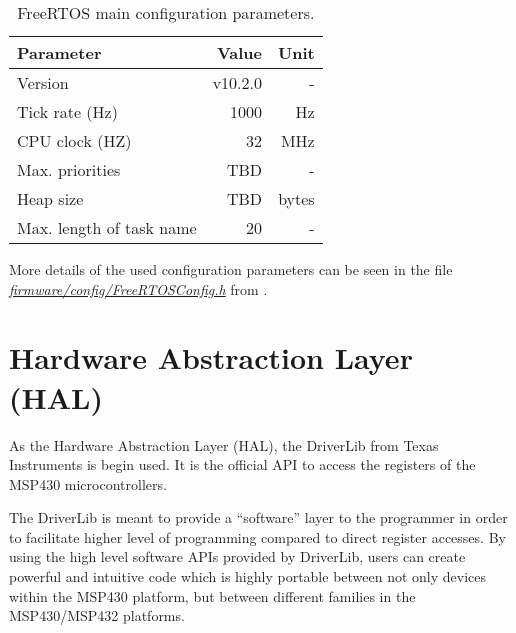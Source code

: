 \begin{table}[!h]
    \centering
    \begin{tabular}{lrr}
        \toprule[1.5pt]
        \textbf{Parameter}       & \textbf{Value} & \textbf{Unit} \\
        \midrule
        Version                  & v10.2.0        & - \\
        Tick rate (Hz)           & 1000           & Hz \\
        CPU clock (HZ)           & 32             & MHz \\
        Max. priorities          & TBD            & - \\
        Heap size                & TBD            & bytes \\
        Max. length of task name & 20             & - \\
        \bottomrule[1.5pt]
    \end{tabular}
    \caption{FreeRTOS main configuration parameters.}
    \label{tab:freertos-config}
\end{table}

More details of the used configuration parameters can be seen in the file \textit{\href{https://github.com/spacelab-ufsc/eps2/blob/master/firmware/config/FreeRTOSConfig.h}{firmware/config/FreeRTOSConfig.h}} from \cite{eps2}.

\section{Hardware Abstraction Layer (HAL)}

As the Hardware Abstraction Layer (HAL), the DriverLib \cite{driverlib} from Texas Instruments is begin used. It is the official API to access the registers of the MSP430 microcontrollers.

The DriverLib is meant to provide a ``software'' layer to the programmer in order to facilitate higher level of programming compared to direct register accesses. By using the high level software APIs provided by DriverLib, users can create powerful and intuitive code which is highly portable between not only devices within the MSP430 platform, but between different families in the MSP430/MSP432 platforms.
